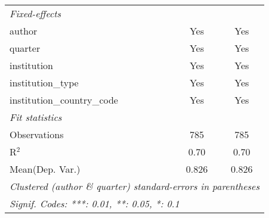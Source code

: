 \begin{tabular}{lcc}
   \midrule
   \emph{Fixed-effects}\\
   author                                   & Yes          & Yes\\  
   quarter                                  & Yes          & Yes\\  
   institution                              & Yes          & Yes\\  
   institution\_type                        & Yes          & Yes\\  
   institution\_country\_code               & Yes          & Yes\\  
   \midrule
   \emph{Fit statistics}\\
   Observations                             & 785          & 785\\  
   R$^2$                                    & 0.70         & 0.70\\  
Mean(Dep. Var.) & 0.826 & 0.826 \\
   \midrule \midrule
   \multicolumn{3}{l}{\emph{Clustered (author \& quarter) standard-errors in parentheses}}\\
   \multicolumn{3}{l}{\emph{Signif. Codes: ***: 0.01, **: 0.05, *: 0.1}}\\
\end{tabular}
\par\endgroup
